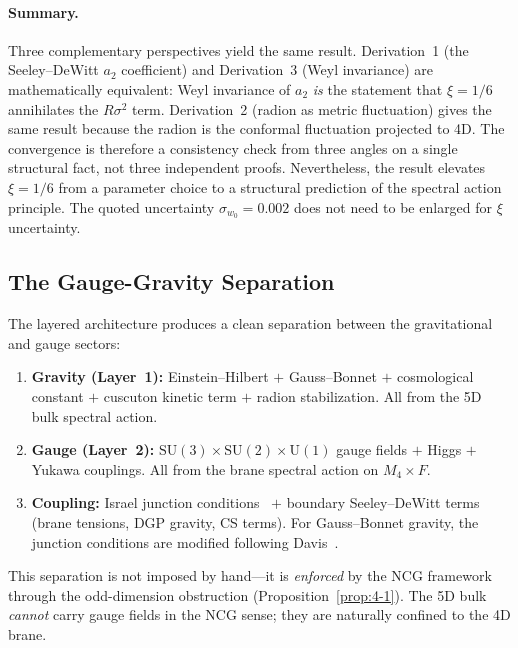 \paragraph{Summary.}
Three complementary perspectives yield the same result. Derivation~1 (the Seeley--DeWitt $a_2$ coefficient) and Derivation~3 (Weyl invariance) are mathematically equivalent: Weyl invariance of $a_2$ \emph{is} the statement that $\xi = 1/6$ annihilates the $R\sigma^2$ term. Derivation~2 (radion as metric fluctuation) gives the same result because the radion is the conformal fluctuation projected to 4D. The convergence is therefore a consistency check from three angles on a single structural fact, not three independent proofs. Nevertheless, the result elevates $\xi = 1/6$ from a parameter choice to a structural prediction of the spectral action principle. The quoted uncertainty $\sigma_{w_0} = 0.002$ does not need to be enlarged for $\xi$ uncertainty.


\subsection{The Gauge-Gravity Separation}
\label{sec:4-gauge-gravity}

The layered architecture produces a clean separation between the gravitational and gauge sectors:

\begin{enumerate}
  \item \textbf{Gravity (Layer~1):} Einstein--Hilbert $+$ Gauss--Bonnet $+$ cosmological constant $+$ cuscuton kinetic term $+$ radion stabilization. All from the 5D bulk spectral action.

  \item \textbf{Gauge (Layer~2):} $\mathrm{SU}(3) \times \mathrm{SU}(2) \times \mathrm{U}(1)$ gauge fields $+$ Higgs $+$ Yukawa couplings. All from the brane spectral action on $M_4 \times F$.

  \item \textbf{Coupling:} Israel junction conditions~\cite{ch4:Shiromizu2000} $+$ boundary Seeley--DeWitt terms (brane tensions, DGP gravity, CS terms). For Gauss--Bonnet gravity, the junction conditions are modified following Davis~\cite{ch4:Davis2003}.
\end{enumerate}

This separation is not imposed by hand---it is \emph{enforced} by the NCG framework through the odd-dimension obstruction (Proposition~\ref{prop:4-1}). The 5D bulk \emph{cannot} carry gauge fields in the NCG sense; they are naturally confined to the 4D brane.



